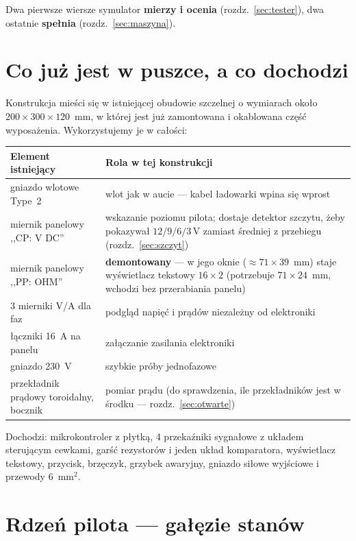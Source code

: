 \documentclass[a4paper,11pt]{article}
\newcommand{\volt}{\,\mathrm{V}}
\begin{document}
Dwa pierwsze wiersze symulator \textbf{mierzy i ocenia} (rozdz.~\ref{sec:tester}),
dwa ostatnie \textbf{spełnia} (rozdz.~\ref{sec:maszyna}).

\section{Co już jest w puszce, a co dochodzi}

Konstrukcja mieści się w istniejącej obudowie szczelnej o wymiarach około
$200\times300\times120$~mm, w której jest już zamontowana i okablowana część
wyposażenia. Wykorzystujemy je w całości:

\begin{center}
\begin{tabular}{p{5.2cm}p{10.0cm}}
\toprule
Element istniejący & Rola w tej konstrukcji \\
\midrule
gniazdo wlotowe Type~2 & wlot jak w aucie --- kabel ładowarki wpina się wprost \\
miernik panelowy ,,CP: V DC'' & wskazanie poziomu pilota; dostaje detektor
  szczytu, żeby pokazywał $12/9/6/3\volt$ zamiast średniej z przebiegu
  (rozdz.~\ref{sec:szczyt}) \\
miernik panelowy ,,PP: OHM'' & \textbf{demontowany} --- w jego oknie
  ($\approx 71\times39$~mm) staje wyświetlacz tekstowy $16\times2$
  (potrzebuje $71\times24$~mm, wchodzi bez przerabiania panelu) \\
3 mierniki V/A dla faz & podgląd napięć i prądów niezależny od elektroniki \\
łączniki 16~A na panelu & załączanie zasilania elektroniki \\
gniazdo 230~V & szybkie próby jednofazowe \\
przekładnik prądowy toroidalny, bocznik & pomiar prądu (do sprawdzenia, ile
  przekładników jest w środku --- rozdz.~\ref{sec:otwarte}) \\
\bottomrule
\end{tabular}
\end{center}

\noindent Dochodzi: mikrokontroler z płytką, 4 przekaźniki sygnałowe z układem
sterującym cewkami, garść rezystorów i jeden układ komparatora, wyświetlacz
tekstowy, przycisk, brzęczyk, grzybek awaryjny, gniazdo siłowe wyjściowe i przewody
$6$~mm$^2$.

\section{Rdzeń pilota --- gałęzie stanów}
\label{sec:rdzen}
\end{document}
